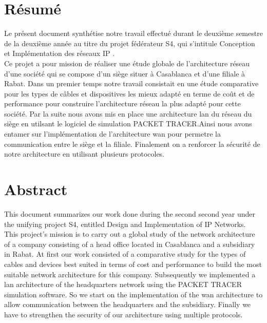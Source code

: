 \documentclass[12pt,a4paper]{report}
\begin{document}





	\chapter*{Résumé}

	Le présent document synthétise notre travail effectué durant le deuxième semestre de la deuxième année au titre du projet fédérateur S4, qui s’intitule \guillemotleft Conception et Implémentation des réseaux IP \guillemotright.\\
	\newline
Ce projet a pour mission de réaliser une étude globale de l'architecture réseau d'une société qui se compose d'un siège situer à Casablanca et d'une filiale à Rabat. Dans un premier temps notre travail consistait en une étude comparative pour les types de câbles et dispositives les mieux adapté en terme de coût et de performance pour construire l'architecture réseau la plus adapté pour cette société. Par la suite nous avons mis en place une architecture \ac{lan} du réseau du siège en utilsant le logiciel de simulation PACKET TRACER.Ainsi nous avons entamer sur l'implémentation de l'architecture \ac{wan} pour permetre la communication entre le siège et la filiale. Finalement on a renforcer la sécurité de notre architecture en utilisant plusieurs protocoles.



	\chapter*{Abstract}
	This document summarizes our work done during the second
second year under the unifying project S4, entitled \guillemotleft Design and Implementation of IP Networks\guillemotright. \\
	\newline
This project's mission is to carry out a global study of the network architecture of
a company consisting of a head office located in Casablanca and a subsidiary in Rabat. At first our work consisted of a comparative study for the types of cables and devices best suited in terms of cost and performance to build the most suitable network architecture for this company. Subsequently we implemented a \ac{lan} architecture of the headquarters network using the PACKET TRACER simulation software. So we start on the implementation of the \ac{wan} architecture to allow communication between the headquarters and the subsidiary. Finally we have to strengthen the security of our architecture using multiple protocols.
	\newpage
\end{document}
